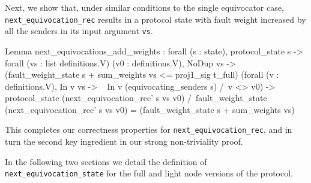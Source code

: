 \documentclass[runningheads]{llncs}
\begin{document}
Next, we show that, under similar conditions to the single equivocator case, \verb|next_equivocation_rec| results in a protocol state with fault weight increased by all the senders in its input argument \verb|vs|. 
\begin{coq}
Lemma next_equivocations_add_weights : 
	forall (s : state),
	protocol_state s ->
	forall (vs : list definitions.V) (v0 : definitions.V),
	NoDup vs -> 
	(fault_weight_state s + sum_weights vs <= proj1_sig t_full)%
	(forall (v : definitions.V),
	In v vs -> ~ In v (equivocating_senders s) /\ v <> v0) ->
	protocol_state (next_equivocation_rec' s vs v0) /\
	fault_weight_state (next_equivocation_rec' s vs v0) =
	(fault_weight_state s + sum_weights vs)%
\end{coq}
This completes our correctness properties for \verb|next_equivocation_rec|, and in turn the second key ingredient in our strong non-triviality proof. 

In the following two sections we detail the definition of \verb|next_equivocation_state| for the full and light node versions of the protocol. 
\end{document}
